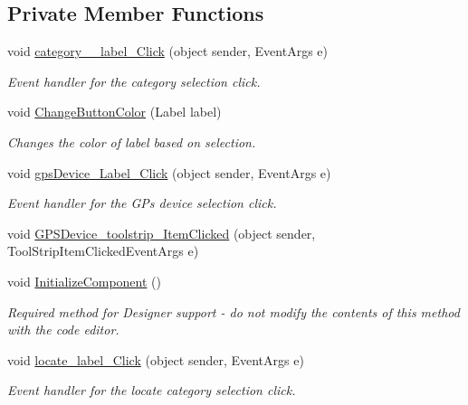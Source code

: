 \subsection*{Private Member Functions}
\begin{DoxyCompactItemize}
\item 
void \hyperlink{classWildlifeTrackingApp_1_1MainPage_a66141b70a6e8d761ca0e50ccb9bb5346}{category\+\_\+\+\_\+label\+\_\+\+Click} (object sender, Event\+Args e)
\begin{DoxyCompactList}\small\item\em Event handler for the category selection click. \end{DoxyCompactList}\item 
void \hyperlink{classWildlifeTrackingApp_1_1MainPage_a219fa14b69b49c53c056f1246586ee7c}{Change\+Button\+Color} (Label label)
\begin{DoxyCompactList}\small\item\em Changes the color of label based on selection. \end{DoxyCompactList}\item 
void \hyperlink{classWildlifeTrackingApp_1_1MainPage_ab39f92c5661e132484e3ec3c2be6dbc6}{gps\+Device\+\_\+\+Label\+\_\+\+Click} (object sender, Event\+Args e)
\begin{DoxyCompactList}\small\item\em Event handler for the G\+Ps device selection click. \end{DoxyCompactList}\item 
void \hyperlink{classWildlifeTrackingApp_1_1MainPage_ad3ed7ab0447838e464c2afe0b67e916a}{G\+P\+S\+Device\+\_\+toolstrip\+\_\+\+Item\+Clicked} (object sender, Tool\+Strip\+Item\+Clicked\+Event\+Args e)
\item 
void \hyperlink{classWildlifeTrackingApp_1_1MainPage_a6405d5db675d5338663195a4d12b4c9f}{Initialize\+Component} ()
\begin{DoxyCompactList}\small\item\em Required method for Designer support -\/ do not modify the contents of this method with the code editor. \end{DoxyCompactList}\item 
void \hyperlink{classWildlifeTrackingApp_1_1MainPage_a9f26712bc47d237729adb6b4e9a78356}{locate\+\_\+label\+\_\+\+Click} (object sender, Event\+Args e)
\begin{DoxyCompactList}\small\item\em Event handler for the locate category selection click. \end{DoxyCompactList}\item 

\end{DoxyCompactItemize}
